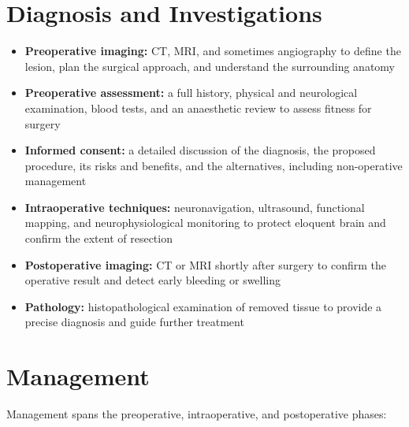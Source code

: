 \section*{Diagnosis and Investigations}
\begin{itemize}
    \item \textbf{Preoperative imaging:} CT, MRI, and sometimes angiography to define the lesion, plan the surgical approach, and understand the surrounding anatomy
    \item \textbf{Preoperative assessment:} a full history, physical and neurological examination, blood tests, and an anaesthetic review to assess fitness for surgery
    \item \textbf{Informed consent:} a detailed discussion of the diagnosis, the proposed procedure, its risks and benefits, and the alternatives, including non-operative management
    \item \textbf{Intraoperative techniques:} neuronavigation, ultrasound, functional mapping, and neurophysiological monitoring to protect eloquent brain and confirm the extent of resection
    \item \textbf{Postoperative imaging:} CT or MRI shortly after surgery to confirm the operative result and detect early bleeding or swelling
    \item \textbf{Pathology:} histopathological examination of removed tissue to provide a precise diagnosis and guide further treatment
\end{itemize}

\section*{Management}
Management spans the preoperative, intraoperative, and postoperative phases:

